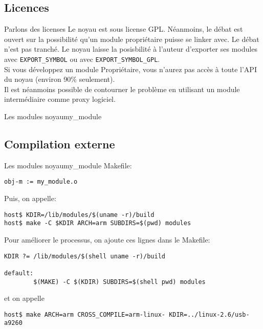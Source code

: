 \subsection{Licences}

\begin{frame}[fragile=singleslide]{Parlons des licenses}
  Le noyau est sous license GPL. Néanmoins, le débat est ouvert sur la
  possibilité  qu'un module  propriétaire puisse  se linker  avec.  Le
  débat n'est pas  tranché. Le noyau laisse la  posisbilité à l'auteur
  d'exporter   ses   modules   avec   \verb+EXPORT_SYMBOL+   ou   avec
  \verb+EXPORT_SYMBOL_GPL+.
\\[2ex]
  Si vous développez un module Propriétaire, vous n'aurez pas accès à
  toute l'API du noyau (environ 90\% seulement).
\\[2ex]
  Il est néanmoins possible de contourner le problème en utilisant un
  module intermédiaire comme proxy logiciel.
\end{frame}

\begin{frame}[fragile=singleslide]{Les modules noyau}{my\_module}
  
\end{frame}

\subsection{Compilation externe}

\begin{frame}[fragile=singleslide]{Les modules noyau}{my\_module}
  Makefile:
  \begin{lstlisting}
obj-m := my_module.o  
  \end{lstlisting}
  Puis, on appelle:
  \begin{lstlisting}
host$ KDIR=/lib/modules/$(uname -r)/build
host$ make -C $KDIR ARCH=arm SUBDIRS=$(pwd) modules
  \end{lstlisting} %
  Pour améliorer le processus, on ajoute ces lignes dans le Makefile:
  \begin{lstlisting}
KDIR ?= /lib/modules/$(shell uname -r)/build

default:
        $(MAKE) -C $(KDIR) SUBDIRS=$(shell pwd) modules
  \end{lstlisting}
  et on appelle
  \begin{lstlisting}
host$ make ARCH=arm CROSS_COMPILE=arm-linux- KDIR=../linux-2.6/usb-a9260 
  \end{lstlisting} %
\end{frame}

